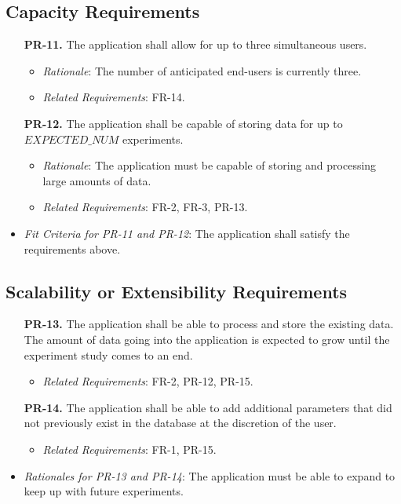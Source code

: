 \documentclass[12pt]{article}
\begin{document}
\subsection{Capacity Requirements}
\begin{enumerate}
  \item[\textbf{PR-11.}] The application shall allow for up to three simultaneous users.
    \begin{itemize}
      \item \textit{Rationale}: The number of anticipated end-users is currently three.
      \item \textit{Related Requirements}: FR-14.
    \end{itemize}
  \item[\textbf{PR-12.}] The application shall be capable of storing data for up
  to \\ $EXPECTED\_NUM$ experiments.
    \begin{itemize}
      \item \textit{Rationale}: The application must be capable of storing and processing large amounts of data.
      \item \textit{Related Requirements}: FR-2, FR-3, PR-13.
    \end{itemize}
\end{enumerate}
\begin{itemize}
  \item \textit{Fit Criteria for PR-11 and PR-12}: The application shall satisfy the requirements above.
\end{itemize}

\subsection{Scalability or Extensibility Requirements}
\begin{enumerate}
  \item[\textbf{PR-13.}] The application shall be able to process and store the existing data. The amount of data going into the application is expected to grow until the experiment study comes to an end.
    \begin{itemize}
      \item \textit{Related Requirements}: FR-2, PR-12, PR-15.
    \end{itemize}
  \item[\textbf{PR-14.}] The application shall be able to add additional parameters that did not previously exist in the database at the discretion of the user.
    \begin{itemize}
      \item \textit{Related Requirements}: FR-1, PR-15.
    \end{itemize}
\end{enumerate}
\begin{itemize}
  \item \textit{Rationales for PR-13 and PR-14}: The application must be able to expand to keep up with future experiments.
\end{itemize}
\end{document}
